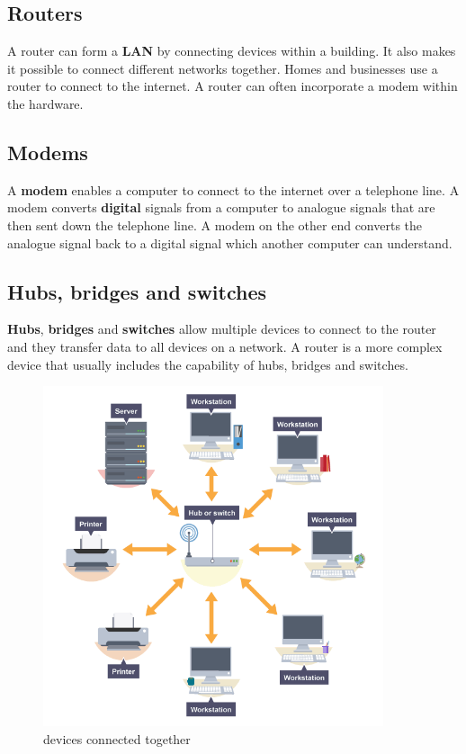 \documentclass[a4paper,12pt]{article}
\begin{document}
\subsection{Routers}
A router can form a \textbf{LAN} by connecting devices within a building. It also makes it possible to connect different networks together. Homes and businesses use a router to connect to the internet. A router can often incorporate a modem within the hardware.

\subsection{Modems}
A \textbf{modem} enables a computer to connect to the internet over a telephone line. A modem converts \textbf{digital} signals from a computer to analogue signals that are then sent down the telephone line. A modem on the other end converts the analogue signal back to a digital signal which another computer can understand.

\subsection{Hubs, bridges and switches}
\textbf{Hubs}, \textbf{bridges} and \textbf{switches} allow multiple devices to connect to the router and they transfer data to all devices on a network. A router is a more complex device that usually includes the capability of hubs, bridges and switches.

\clearpage

\begin{figure}
\centering
\includegraphics[width=10cm]{./hbs.PNG}
\caption{devices connected together}\label{wrap-fig:5}
\end{figure}
\end{document}
